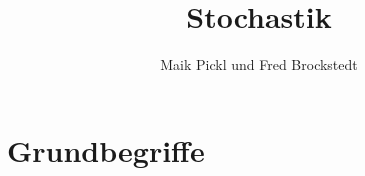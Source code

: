 \documentclass[10pt,a4paper]{report}
\author{Maik Pickl und Fred Brockstedt}
\title{Stochastik}
\numberwithin{equation}{section}
\numberwithin{figure}{section}
\theoremstyle{plain}
\theoremstyle{definition}
\theoremstyle{plain}
\theoremstyle{definition}
\theoremstyle{remark}
\theoremstyle{plain}
\theoremstyle{plain}
\theoremstyle{plain}
\theoremstyle{plain}
\theoremstyle{plain}
\newcommand{\1}{ \mathbb{1} } %
\begin{document}


\tableofcontents{}
\chapter{Grundbegriffe}
\end{document}
